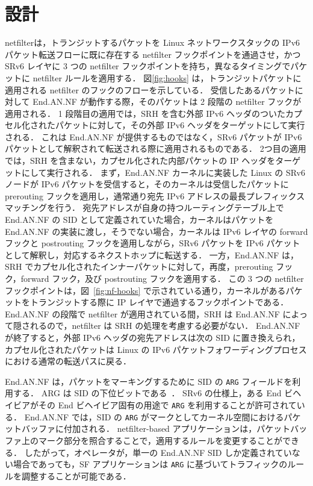 \section{設計}
\label{section:design}
netfilterは，トランジットするパケットを Linux ネットワークスタックの IPv6 パケット転送フローに既に存在する netfilter フックポイントを通過させ，かつ SRv6 レイヤに 3 つの netfilter フックポイントを持ち，異なるタイミングでパケットに netfilter ルールを適用する．
図\ref*{fig:hooks} は，トランジットパケットに適用される netfilter のフックのフローを示している．
受信したあるパケットに対して End.AN.NF が動作する際，そのパケットは 2 段階の netfilter フックが適用される．
1 段階目の適用では，SRH を含む外部 IPv6 ヘッダのついたカプセル化されたパケットに対して，その外部 IPv6 ヘッダをターゲットにして実行される．
これは End.AN.NF が提供するものではなく，SRv6 パケットが IPv6 パケットとして解釈されて転送される際に適用されるものである．
2つ目の適用では，SRH を含まない，カプセル化された内部パケットの IP ヘッダをターゲットにして実行される．
まず，End.AN.NF カーネルに実装した Linux の SRv6 ノードが IPv6 パケットを受信すると，そのカーネルは受信したパケットに prerouting フックを適用し，通常通り宛先 IPv6 アドレスの最長プレフィックスマッチングを行う．
宛先アドレスが自身の持つルーティングテーブル上で End.AN.NF の SID として定義されていた場合，カーネルはパケットを End.AN.NF の実装に渡し，そうでない場合，カーネルは IPv6 レイヤの forward フックと postrouting フックを適用しながら，SRv6 パケットを IPv6 パケットとして解釈し，対応するネクストホップに転送する．
一方，End.AN.NF は，SRH でカプセル化されたインナーパケットに対して，再度，prerouting フック，forward フック，及び postrouting フックを適用する．
この 3 つの netfilter フックポイントは，図~\ref*{fig:nf-hooks} で示されている通り，カーネルがあるパケットをトランジットする際に IP レイヤで通過するフックポイントである．
End.AN.NF の段階で netfilter が適用されている間，SRH は End.AN.NF によって隠されるので，netfilter は SRH の処理を考慮する必要がない．
End.AN.NF が終了すると，外部 IPv6 ヘッダの宛先アドレスは次の SID に置き換えられ，カプセル化されたパケットは Linux の IPv6 パケットフォワーディングプロセスにおける通常の転送パスに戻る．

End.AN.NF は，パケットをマーキングするために SID の \texttt{ARG} フィールドを利用する．
ARG は SID の下位ビットである~\cite{rfc8986}．
SRv6 の仕様上，ある End ビヘイビアがその End ビヘイビア固有の用途で \texttt{ARG} を利用することが許可されている．
End.AN.NF では，SID の \texttt{ARG} がマークとしてカーネル空間におけるパケットバッファに付加される．
netfilter-based アプリケーションは，パケットバッファ上のマーク部分を照合することで，適用するルールを変更することができる．
したがって，オペレータが，単一の End.AN.NF SID しか定義されていない場合であっても，SF アプリケーションは \texttt{ARG} に基づいてトラフィックのルールを調整することが可能である．

